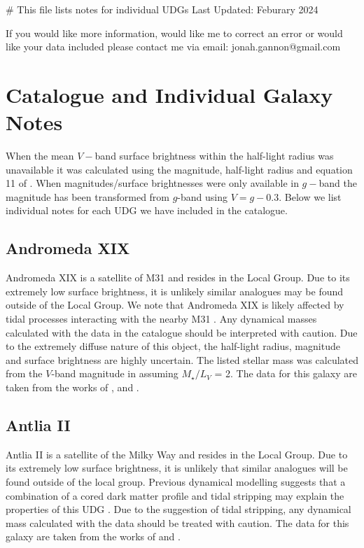 # This file lists notes for individual UDGs 
Last Updated: Feburary 2024

If you would like more information, would like me to correct an error or would like your data included please contact me via email:
jonah.gannon@gmail.com

\section{Catalogue and Individual Galaxy Notes} \label{sec:catalogue}
When the mean $V-$band surface brightness within the half-light radius was unavailable it was calculated using the magnitude, half-light radius and equation 11 of \citet{Graham2005}.  When magnitudes/surface brightnesses were only available in $g-$band the magnitude has been transformed from $g$-band using $V=g-0.3$. Below we list individual notes for each UDG we have included in the catalogue.

\subsection{Andromeda XIX}
Andromeda XIX is a satellite of M31 and resides in the Local Group. Due to its extremely low surface brightness, it is unlikely similar analogues may be found outside of the Local Group. We note that Andromeda XIX is likely affected by tidal processes interacting with the nearby M31 \citep{Collins2020, Collins2022}. Any dynamical masses calculated with the data in the catalogue should be interpreted with caution. Due to the extremely diffuse nature of this object, the half-light radius, magnitude and surface brightness are highly uncertain. The listed stellar mass was calculated from the $V$-band magnitude in \citet{Martin2016} assuming $M_{\star}/L_{V}$ = 2. The data for this galaxy are taken from the works of \citet{Martin2016}, \citet{Collins2020} and \citet{Gannon2021}.

\subsection{Antlia II}
Antlia II is a satellite of the Milky Way and resides in the Local Group. Due to its extremely low surface brightness, it is unlikely that similar analogues will be found outside of the local group. Previous dynamical modelling suggests that a combination of a cored dark matter profile and tidal stripping may explain the properties of this UDG \citep{torrealba2019}. Due to the suggestion of tidal stripping, any dynamical mass calculated with the data should be treated with caution. The data for this galaxy are taken from the works of \citet{mcconnachie2012} and \citet{torrealba2019}.

